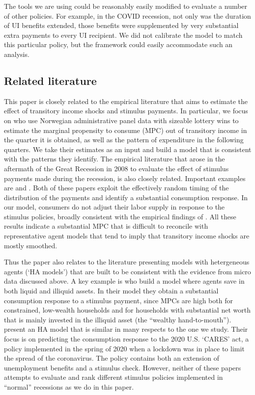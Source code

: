 \documentclass[../HAFiscal]{subfiles}
\begin{document}
The tools we are using could be reasonably easily modified to evaluate a number of other policies.  For example, in the COVID recession, not only was the duration of UI benefits extended, those benefits were supplemented by very substantial extra payments to every UI recipient.  We did not calibrate the model to match this particular policy, but the framework could easily accommodate such an analysis.

\subsection{Related literature}
\label{sec:lit}

This paper is closely related to the empirical literature that aims to estimate the effect of transitory income shocks and stimulus payments. In particular, we focus on \cite{fagereng_mpc_2021} who use Norwegian administrative panel data with sizeable lottery wins to estimate the marginal propensity to consume (MPC) out of transitory income in the quarter it is obtained, as well as the pattern of expenditure in the following quarters. We take their estimates as an input and build a model that is consistent with the patterns they identify. The empirical literature that arose in the aftermath of the Great Recession in 2008 to evaluate the effect of stimulus payments made during the recession, is also closely related. Important examples are \cite{parker2013consumer} and \cite{broda2014economic}. Both of these papers exploit the effectively random timing of the distribution of the payments and identify a substantial consumption response. In our model, consumers do not adjust their labor supply in response to the stimulus policies, broadly consistent with the empirical findings of \cite{ganong2022spending}. All these results indicate a substantial MPC that is difficult to reconcile with representative agent models that tend to imply that transitory income shocks are mostly smoothed. 

Thus the paper also relates to the literature presenting models with hetergeneous agents (`HA models') that are built to be consistent with the evidence from micro data discussed above. A key example is \cite{kaplan2014model} who build a model where agents save in both liquid and illiquid assets. In their model they obtain a substantial consumption response to a stimulus payment, since MPCs are high both for constrained, low-wealth households and for households with substantial net worth that is mainly invested in the illiquid asset (the ``wealthy hand-to-mouth''). \cite{carroll2020modeling} present an HA model that is similar in many respects to the one we study. Their focus is on predicting the consumption response to the 2020 U.S. `CARES' act, a policy implemented in the spring of 2020 when a lockdown was in place to limit the spread of the coronavirus. The policy contains both an extension of unemployment benefits and a stimulus check. However, neither of these papers attempts to evaluate and rank different stimulus policies implemented in ``normal'' recessions as we do in this paper. 
\end{document}

